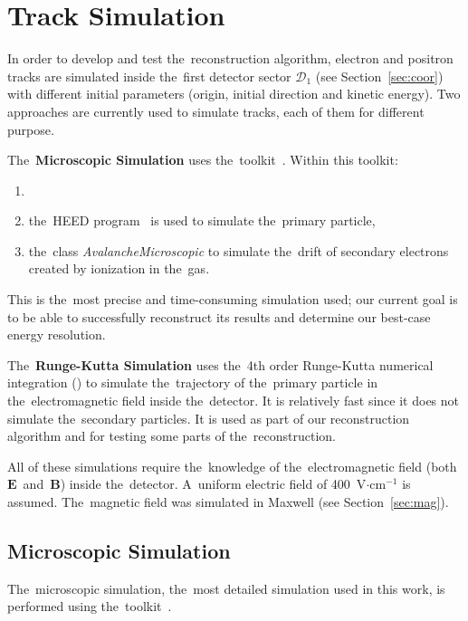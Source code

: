 \chapter{Track Simulation}
	In order to develop and test the~reconstruction algorithm, electron and positron tracks are simulated inside the~first detector sector $\mathcal{D}_1$ (see Section~\ref{sec:coor}) with different initial parameters (origin, initial direction and kinetic energy). Two approaches are currently used to simulate tracks, each of them for different purpose.
	
	The~\textbf{Microscopic Simulation} uses the~\garfieldpp toolkit~\cite{Garfield++}. Within this toolkit:
		\begin{enumerate}[nosep,label=\alph*)]
			\item {}
			\item the~\ac{HEED} program~\cite{HEED} is used to simulate the~primary particle,
			\item the~class \textit{AvalancheMicroscopic} to simulate the~drift of secondary electrons created by ionization in the~gas.
		\end{enumerate}
	This is the~most precise and time-consuming simulation used; our current goal is to be able to successfully reconstruct its results and determine our best-case energy resolution.
	
	The~\textbf{Runge-Kutta Simulation} uses the~4th order Runge-Kutta numerical integration () to simulate the~trajectory of the~primary particle in the~electromagnetic field inside the~detector. It is relatively fast since it does not simulate the~secondary particles. It is used as part of our reconstruction algorithm and for testing some parts of the~reconstruction.
	
	All of these simulations require the~knowledge of the~electromagnetic field (both $\mathbf{E}$~and~$\mathbf{B}$) inside the~detector. A~uniform electric field of 400~V$\cdot$cm$^{-1}$ is assumed. The~magnetic field was simulated in Maxwell (see Section~\ref{sec:mag}). 
	
	
	\section{Microscopic Simulation}
	\label{sec:microsim}
		The~microscopic simulation, the~most detailed simulation used in this work, is performed using the~\garfieldpp toolkit~\cite{Garfield++}.
		
